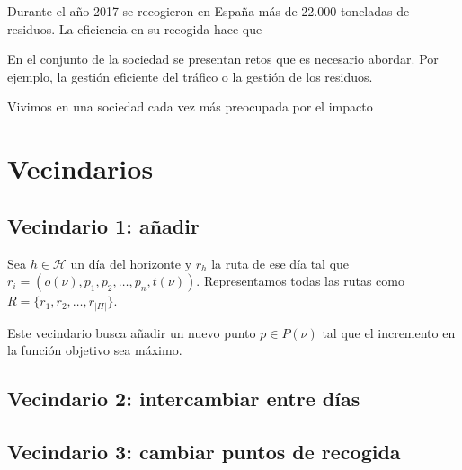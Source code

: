 \documentclass[
]{article}
\begin{document}
Durante el año 2017 se recogieron en España más de 22.000 toneladas de
residuos. La eficiencia en su recogida hace que

En el conjunto de la sociedad se presentan retos que es necesario
abordar. Por ejemplo, la gestión eficiente del tráfico o la gestión de
los residuos.

Vivimos en una sociedad cada vez más preocupada por el impacto

\hypertarget{vecindarios}{%
\section{Vecindarios}\label{vecindarios}}

\hypertarget{vecindario-1-auxf1adir}{%
\subsection{Vecindario 1: añadir}\label{vecindario-1-auxf1adir}}

Sea \(h\in\mathcal{H}\) un día del horizonte y \(r_h\) la ruta de ese
día tal que \(r_i=(o(\nu), p_1, p_2, \ldots, p_n, t(\nu))\).
Representamos todas las rutas como \(R=\{r_1, r_2,\ldots, r_{|H|}\}\).

Este vecindario busca añadir un nuevo punto \(p\in P(\nu)\) tal que el
incremento en la función objetivo sea máximo.

\hypertarget{vecindario-2-intercambiar-entre-duxedas}{%
\subsection{Vecindario 2: intercambiar entre
días}\label{vecindario-2-intercambiar-entre-duxedas}}

\hypertarget{vecindario-3-cambiar-puntos-de-recogida}{%
\subsection{Vecindario 3: cambiar puntos de
recogida}\label{vecindario-3-cambiar-puntos-de-recogida}}
\end{document}

